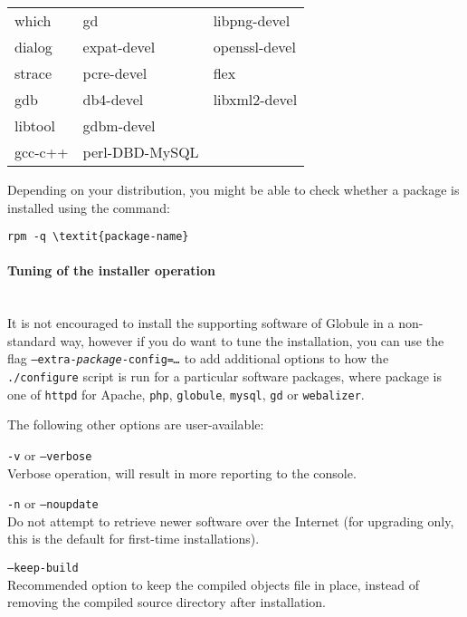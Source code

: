 \documentclass[10pt,a4paper]{article}
\makeatletter
\newenvironment{p}{\@open{P}{}}{\@close{P}}
\newenvironment{p}{}{\par}
\makeatother
\begin{document}
\begin{p}
\begin{tabular}{lll}
which    & gd              & libpng-devel  \\
dialog   & expat-devel     & openssl-devel \\
strace   & pcre-devel      & flex          \\
gdb      & db4-devel       & libxml2-devel \\
libtool  & gdbm-devel      & ~ \\
gcc-c++  & perl-DBD-MySQL  & ~ \\
\end{tabular}
\end{p}

\begin{p}
Depending on your distribution, you might be able to check whether a package
is installed using the command:
\end{p}
\begin{Verbatim}
rpm -q \textit{package-name}
\end{Verbatim}

\paragraph{Tuning of the installer operation} ~\\

\begin{p}
It is not encouraged to install the supporting software of Globule in a
non-standard way, however if you do want to tune the installation, you can use
the flag \texttt{--extra-\textit{package}-config=\textit{\ldots}} to add
additional options to how the \texttt{./configure} script is run for a
particular software packages, where package is one of \texttt{httpd} for
Apache, \texttt{php}, \texttt{globule}, \texttt{mysql}, \texttt{gd} or
\texttt{webalizer}.
\end{p}

\begin{p}
The following other options are user-available:
\begin{description}
\item{\texttt{-v} or \texttt{--verbose}} \\
  Verbose operation, will result in more reporting to the console. \\
\item{\texttt{-n} or \texttt{--noupdate}} \\
  Do not attempt to retrieve newer software over the Internet (for upgrading
  only, this is the default for first-time installations).
\item{\texttt{--keep-build}} \\
  Recommended option to keep the compiled objects file in place, instead of
  removing the compiled source directory after installation.
\end{description}
\end{p}
\end{document}

